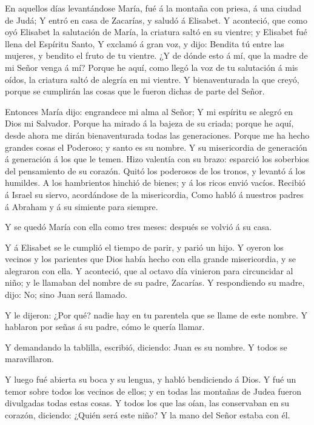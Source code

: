  En aquellos días levantándose María, fué á la montaña con
priesa, á una ciudad de Judá;  Y entró en casa de Zacarías,
y saludó á Elisabet.  Y aconteció, que como oyó Elisabet la
salutación de María, la criatura saltó en su vientre; y Elisabet fué
llena del Espíritu Santo,  Y exclamó á gran voz, y dijo:
Bendita tú entre las mujeres, y bendito el fruto de tu vientre.
 ¿Y de dónde esto á mí, que la madre de mi Señor venga á
mí?  Porque he aquí, como llegó la voz de tu salutación á
mis oídos, la criatura saltó de alegría en mi vientre.  Y
bienaventurada la que creyó, porque se cumplirán las cosas que le fueron
dichas de parte del Señor.

 Entonces María dijo: engrandece mi alma al Señor;
 Y mi espíritu se alegró en Dios mi Salvador. 
Porque ha mirado á la bajeza de su criada; porque he aquí, desde ahora
me dirán bienaventurada todas las generaciones.  Porque me
ha hecho grandes cosas el Poderoso; y santo es su nombre. 
Y su misericordia de generación á generación á los que le temen.
 Hizo valentía con su brazo: esparció los soberbios del
pensamiento de su corazón.  Quitó los poderosos de los
tronos, y levantó á los humildes.  A los hambrientos
hinchió de bienes; y á los ricos envió vacíos.  Recibió á
Israel su siervo, acordándose de la misericordia,  Como
habló á nuestros padres á Abraham y á su simiente para siempre.

 Y se quedó María con ella como tres meses: después se
volvió á su casa.

 Y á Elisabet se le cumplió el tiempo de parir, y parió un
hijo.  Y oyeron los vecinos y los parientes que Dios había
hecho con ella grande misericordia, y se alegraron con ella.
 Y aconteció, que al octavo día vinieron para circuncidar
al niño; y le llamaban del nombre de su padre, Zacarías.  Y
respondiendo su madre, dijo: No; sino Juan será llamado.

 Y le dijeron: ¿Por qué? nadie hay en tu parentela que se
llame de este nombre.  Y hablaron por señas á su padre,
cómo le quería llamar.

 Y demandando la tablilla, escribió, diciendo: Juan es su
nombre. Y todos se maravillaron.

 Y luego fué abierta su boca y su lengua, y habló
bendiciendo á Dios.  Y fué un temor sobre todos los vecinos
de ellos; y en todas las montañas de Judea fueron divulgadas todas estas
cosas.  Y todos los que las oían, las conservaban en su
corazón, diciendo: ¿Quién será este niño? Y la mano del Señor estaba con
él.


